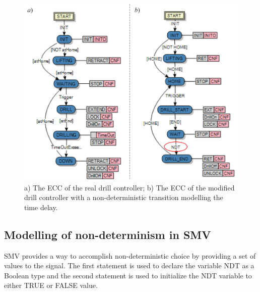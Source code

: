 \documentclass[conference]{IEEEtran}
\begin{document}
\begin{figure}
    \centering
    \includegraphics[scale = 0.24]{images/Fig10.png}
    \caption{ a) The ECC of the real drill controller; b) The ECC of the modified drill controller with a non-deterministic transition modelling the time delay.}
    \label{figure:DrillECCControllers}
\end{figure}


\subsection{Modelling of non-determinism in SMV}\label{sec:NDTinSMV}



SMV provides a way to accomplish non-deterministic choice by providing a set of values to the signal. The first statement is used to  declare the variable NDT as a Boolean type and the second statement is used to initialize the NDT variable to either TRUE or FALSE value.
\end{document}
